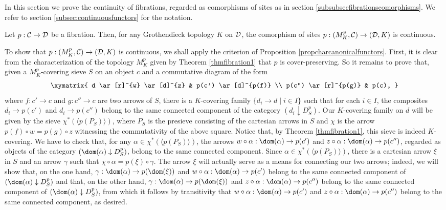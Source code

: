 \documentclass[a4paper,12pt]{article}
\begin{document}
In this section we prove the continuity of fibrations, regarded as comorphisms of sites as in section \ref{subsubsecfibrationscomorphisms}. We refer to section \ref{subsec:continuousfunctors} for the notation.

\begin{theorem}\label{thmfibration2}
	Let $p:{\cal C}\to {\cal D}$ be a fibration. Then, for any Grothendieck topology $K$ on $\cal D$, the comorphism of sites $p:(M^{p}_{K}, {\cal C})\to ({\cal D}, K)$ is continuous.
\end{theorem}

\begin{proofs}
	To show that $p:(M^{p}_{K}, {\cal C})\to ({\cal D}, K)$ is continuous, we shall apply the criterion of Proposition \ref{propcharcanonicalfunctors}. First, it is clear from the characterization of the topology $M^{p}_{K}$ given by Theorem \ref{thmfibration1} that $p$ is cover-preserving. So it remains to prove that, given a $M^{p}_{K}$-covering sieve $S$ on an object $c$ and a commutative diagram of the form 
	\[
	\xymatrix{
		d \ar[r]^{w} \ar[d]^{z}  & p(c') \ar[d]^{p(f)} \\
		p(c'') \ar[r]^{p(g)} & p(c),
	} 
	\]	
	where $f:c'\to c$ and $g:c''\to c$ are two arrows of $S$, there is a $K$-covering family $\{d_{i}\to d \mid i\in I\}$ such that for each $i\in I$, the composites $d_{i}\to p(c')$ and $d_{i}\to p(c'')$ belong to the same connected component of the category $(d_{i}\downarrow D^{p}_{S})$. Our $K$-covering family on $d$ will be given by the sieve $\chi^{\ast}(\langle p(P_{S})\rangle )$, where $P_{S}$ is the presieve consisting of the cartesian arrows in $S$ and $\chi$ is the arrow $p(f)\circ w=p(g)\circ z$ witnessing the commutativity of the above square. Notice that, by Theorem \ref{thmfibration1}, this sieve is indeed $K$-covering. We have to check that, for any $\alpha\in \chi^{\ast}(\langle p(P_{S})\rangle )$, the arrows $w\circ \alpha:\dom(\alpha)\to p(c')$ and $z\circ \alpha:\dom(\alpha)\to p(c'')$, regarded as objects of the category $(\dom(\alpha)\downarrow D^{p}_{S})$, belong to the same connected component. Since $\alpha\in \chi^{\ast}(\langle p(P_{S})\rangle )$, there is a cartesian arrow $\xi$ in $S$ and an arrow $\gamma$ such that $\chi\circ \alpha =p(\xi)\circ \gamma$. The arrow $\xi$ will actually serve as a means for connecting our two arrows; indeed, we will show that, on the one hand, $\gamma:\dom(\alpha)\to p(\dom(\xi))$ and $w\circ \alpha:\dom(\alpha)\to p(c')$ belong to the same connected component of $(\dom(\alpha)\downarrow D^{p}_{S})$ and that, on the other hand, $\gamma:\dom(\alpha)\to p(\dom(\xi))$ and $z\circ \alpha:\dom(\alpha)\to p(c'')$ belong to the same connected component of $(\dom(\alpha)\downarrow D^{p}_{S})$, from which it follows by transitivity that $w\circ \alpha:\dom(\alpha)\to p(c')$ and $z\circ \alpha:\dom(\alpha)\to p(c'')$ belong to the same connected component, as desired. 
	

\end{proofs}
\end{document}

